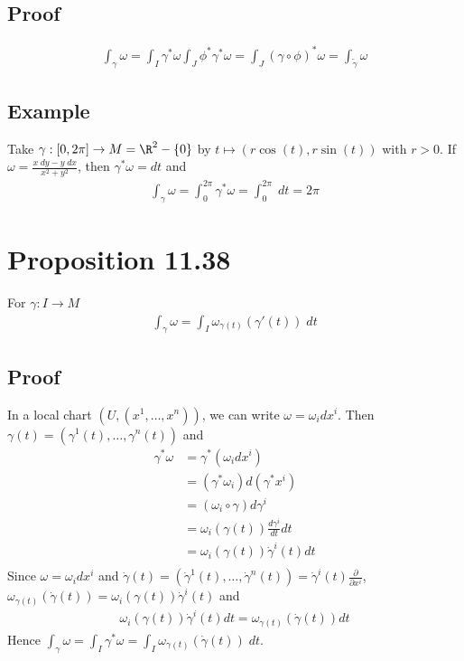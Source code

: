 \documentclass[11pt]{article}
\begin{document}
\subsection*{Proof}
\label{sec:org0ec5433}
\begin{align*}
  \int_{\gamma}\omega
  =\int_{I}\gamma^{*}\omega
  \int_{J}\phi^{*}\gamma^{*}\omega
  =\int_{J}(\gamma\circ\phi)^{*}\omega
  =\int_{\tilde{\gamma}}\omega
\end{align*}
\subsection*{Example}
\label{sec:org5fa9032}
Take \(\gamma:[0,2\pi]\to M=\R^{2}-\{0\}\) by \(t\mapsto(r\cos(t),r\sin(t))\) with \(r>0\). If \(\omega=\frac{x\;dy-y\;dx}{x^{2}+y^{2}}\), then \(\gamma^{*}\omega=dt\) and\\
\begin{align*}
  \int_{\gamma}\omega
  =\int_{0}^{2\pi}\gamma^{*}\omega
  =\int_{0}^{2\pi}\;dt
  =2\pi
\end{align*}
\section*{Proposition 11.38}
\label{sec:org9a74c32}
For \(\gamma:I\to M\)\\
\begin{align*}
  \int_{\gamma}\omega
  =\int_{I}\omega_{\gamma(t)}(\gamma'(t))\;dt
\end{align*}
\subsection*{Proof}
\label{sec:org4b3d48e}
In a local chart \((U,(x^{1},\ldots,x^{n}))\), we can write \(\omega=\omega_{i}dx^{i}\). Then \(\gamma(t)=(\gamma^{1}(t),\ldots,\gamma^{n}(t))\) and\\
\begin{align*}
  \gamma^{*}\omega
  &=\gamma^{*}(\omega_{i}dx^{i}) \\
  &=(\gamma^{*}\omega_{i})d(\gamma^{*}x^{i}) \\
  &=(\omega_{i}\circ\gamma)d\gamma^{i} \\
  &=\omega_{i}(\gamma(t))\frac{d\gamma^{i}}{dt}dt \\
  &=\omega_{i}(\gamma(t))\dot{\gamma}^{i}(t)dt \\
\end{align*}
Since \(\omega=\omega_{i}dx^{i}\) and \(\dot{\gamma}(t)=(\dot{\gamma}^{1}(t),\dots,\dot{\gamma}^{n}(t))=\dot{\gamma}^{i}(t)\frac{\partial}{\partial x^{i}}\), \(\omega_{\gamma(t)}(\dot{\gamma}(t))=\omega_{i}(\gamma(t))\dot{\gamma}^{i}(t)\) and\\
\begin{align*}
  \omega_{i}(\gamma(t))\dot{\gamma}^{i}(t)dt
  =\omega_{\gamma(t)}(\dot{\gamma}(t))dt
\end{align*}
Hence \(\int_{\gamma}\omega=\int_{I}\gamma^{*}\omega=\int_{I}\omega_{\gamma(t)}(\dot{\gamma}(t))\;dt\).\\
\end{document}
